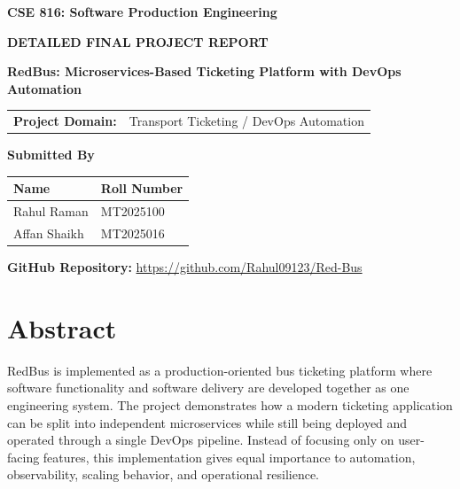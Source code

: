 \documentclass[12pt,a4paper]{article}
\begin{document}
\begin{titlepage}
    \centering
    \vspace*{1.8cm}
    {\Large \textbf{CSE 816: Software Production Engineering}\par}
    \vspace{1.2cm}
    {\huge \textbf{DETAILED FINAL PROJECT REPORT}\par}
    \vspace{0.7cm}
    {\Large \textbf{RedBus: Microservices-Based Ticketing Platform with DevOps Automation}\par}
    \vspace{1.8cm}

    \begin{tabular}{>{\bfseries}p{4cm} p{8cm}}
        Project Domain: & Transport Ticketing / DevOps Automation \\
    \end{tabular}

    \vfill

    {\Large \textbf{Submitted By}\par}
    \vspace{0.6cm}
    \begin{tabular}{|p{6cm}|p{4cm}|}
        \hline
        \textbf{Name} & \textbf{Roll Number} \\
        \hline
        Rahul Raman & MT2025100 \\
        \hline
        Affan Shaikh & MT2025016 \\
        \hline
    \end{tabular}

    \vfill
    {\large \textbf{GitHub Repository:} \url{https://github.com/Rahul09123/Red-Bus}\par}

\end{titlepage}

\tableofcontents
\newpage
{}

\section{Abstract}

RedBus is implemented as a production-oriented bus ticketing platform where software functionality and software delivery are developed together as one engineering system. The project demonstrates how a modern ticketing application can be split into independent microservices while still being deployed and operated through a single DevOps pipeline. Instead of focusing only on user-facing features, this implementation gives equal importance to automation, observability, scaling behavior, and operational resilience.
\end{document}
